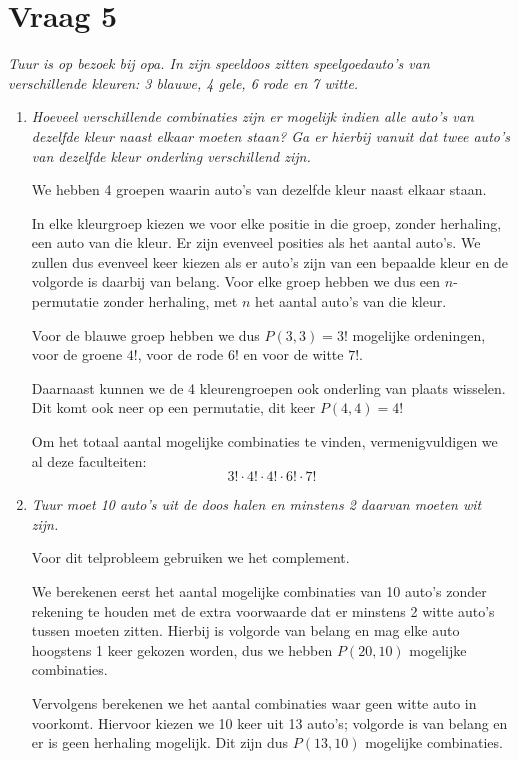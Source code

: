 \documentclass[kulak]{kulakarticle} %
\begin{document}
	\section*{Vraag 5}

	\textit{Tuur is op bezoek bij opa. In zijn speeldoos zitten speelgoedauto's van verschillende kleuren: 3 blauwe, 4 gele, 6 rode en 7 witte.}

	\begin{enumerate}
		\item \textit{Hoeveel verschillende combinaties zijn er mogelijk indien alle auto's van dezelfde kleur naast elkaar moeten staan? Ga er hierbij vanuit dat twee auto's van dezelfde kleur onderling verschillend zijn.}

		We hebben 4 groepen waarin auto's van dezelfde kleur naast elkaar staan.

		In elke kleurgroep kiezen we voor elke positie in die groep, zonder herhaling, een auto van die kleur. Er zijn evenveel posities als het aantal auto's. We zullen dus evenveel keer kiezen als er auto's zijn van een bepaalde kleur en de volgorde is daarbij van belang. Voor elke groep hebben we dus een \(n\)-permutatie zonder herhaling, met \(n\) het aantal auto's van die kleur.

		Voor de blauwe groep hebben we dus \(P(3,3)=3!\) mogelijke ordeningen, voor de groene \(4!\), voor de rode \(6!\) en voor de witte \(7!\).

		Daarnaast kunnen we de 4 kleurengroepen ook onderling van plaats wisselen. Dit komt ook neer op een permutatie, dit keer \(P(4,4)=4!\)

		Om het totaal aantal mogelijke combinaties te vinden, vermenigvuldigen we al deze faculteiten: \[3!\cdot 4! \cdot 4! \cdot 6! \cdot 7!\]

		\item \textit{Tuur moet 10 auto's uit de doos halen en minstens 2 daarvan moeten wit zijn.}

		Voor dit telprobleem gebruiken we het complement.

		We berekenen eerst het aantal mogelijke combinaties van 10 auto's zonder rekening te houden met de extra voorwaarde dat er minstens 2 witte auto's tussen moeten zitten. Hierbij is volgorde van belang en mag elke auto hoogstens 1 keer gekozen worden, dus we hebben \(P(20,10)\) mogelijke combinaties.

		Vervolgens berekenen we het aantal combinaties waar geen witte auto in voorkomt. Hiervoor kiezen we 10 keer uit 13 auto's; volgorde is van belang en er is geen herhaling mogelijk. Dit zijn dus \(P(13,10)\) mogelijke combinaties.


\end{enumerate}
\end{document}
